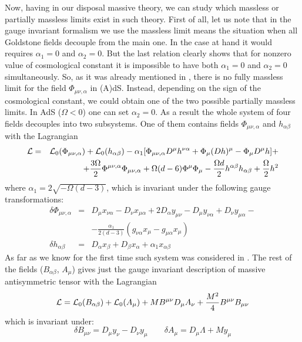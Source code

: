 \documentclass[a4paper,12pt]{article}
\begin{document}
Now, having in our disposal massive theory, we can study which
massless or partially massless limits exist in such theory. First of
all, let us note that in the gauge invariant formalism we use the
massless limit means the situation when all Goldstone fields decouple
from the main one. In the case at hand it would requires $\alpha_1 = 0$
and $\alpha_2 = 0$. But the last relation clearly shows that for nonzero
value of cosmological constant it is impossible to have both $\alpha_1 = 0$
and $\alpha_2 = 0$ simultaneously. So, as it was already mentioned in
\cite{BMV00}, there is no fully massless limit for the field
$\Phi_{\mu\nu,\alpha}$ in (A)dS. Instead, depending on the sign of the
cosmological constant, we could obtain one of the two possible partially
massless limits. In AdS ($\Omega < 0$) one can set $\alpha_2 = 0$. As a
result the whole system of four fields decouples into two subsystems.
One of them contains fields $\Phi_{\mu\nu,\alpha}$ and $h_{\alpha\beta}$
with the Lagrangian
\begin{eqnarray}
{\cal L} &=& {\cal L}_0 (\Phi_{\mu\nu,\alpha}) + {\cal L}_0 (h_{\alpha\beta})
- \alpha_1 [ \Phi_{\mu\nu,\alpha} D^\mu h^{\nu\alpha} + \Phi_\mu
(D h)^\mu - \Phi_\mu D^\mu h ] + \nonumber \\
 && + \frac{3\Omega}{2} \Phi^{\mu\nu,\alpha} \Phi_{\mu\nu,\alpha} +
\Omega (d-6) \Phi^\mu \Phi_\mu - \frac{\Omega d}{2} h^{\alpha\beta}
h_{\alpha\beta} + \frac{\Omega}{2} h^2
\end{eqnarray}
where $\alpha_1 = 2 \sqrt{-\Omega(d-3)}$, which is invariant under
the following gauge transformations:
\begin{eqnarray}
\delta \Phi_{\mu\nu,\alpha} &=& D_\mu x_{\nu\alpha} - D_\nu x_{\mu\alpha}
+ 2 D_\alpha y_{\mu\nu} - D_\mu y_{\nu\alpha} + D_\nu y_{\mu\alpha} -
\nonumber \\
 && - \frac{\alpha_1}{2(d-3)} (g_{\nu\alpha} x_\mu - g_{\mu\alpha}
 x_\mu) \\
\delta h_{\alpha\beta} &=& D_\alpha x_\beta + D_\beta x_\alpha +
\alpha_1 x_{\alpha\beta} \nonumber
\end{eqnarray}
As far as we know for the first time such system was considered in
\cite{BMV00}. The rest of the fields ($B_{\alpha\beta}$, $A_\mu$)
gives just the gauge invariant description of massive antisymmetric
tensor with the Lagrangian
\begin{equation}
{\cal L} = {\cal L}_0 (B_{\alpha\beta}) + {\cal L}_0 (A_\mu) +
M B^{\mu\nu} D_\mu A_\nu + \frac{M^2}{4} B^{\mu\nu} B_{\mu\nu}
\end{equation}
which is invariant under:
\begin{equation}
\delta B_{\mu\nu} = D_\mu y_\nu - D_\nu y_\mu \qquad \delta A_\mu =
D_\mu \Lambda + M y_\mu
\end{equation}
\end{document}
